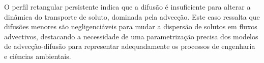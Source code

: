 O perfil retangular persistente indica que a difusão é insuficiente para alterar a dinâmica do transporte de soluto, dominada pela advecção. Este caso ressalta que difusões menores são negligenciáveis para mudar a dispersão de solutos em fluxos advectivos, destacando a necessidade de uma parametrização precisa dos modelos de advecção-difusão para representar adequadamente os processos de engenharia e ciências ambientais.
